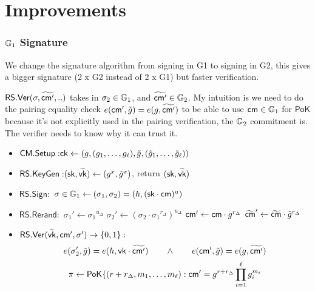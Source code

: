 \newpage
\section{Improvements}


\subsubsection{$\mathbb{G}_1$ Signature}
We change the signature algorithm from signing in G1 to signing in G2, this gives a bigger signature (2 x G2 instead of 2 x G1) but faster verification.    

\noindent $\mathsf{RS.Ver}(\sigma, \widetilde{\mathsf{cm}'}, ..)$ takes in $\sigma_2 \in \mathbb{G}_1$, and $\widetilde{\mathsf{cm}'} \in \mathbb{G}_2$. My intuition is we need to do the pairing equality check $e(\mathsf{cm}', \tilde{g}) = e(g, \widetilde{\mathsf{cm}'}) $ to be able to use $\mathsf{cm} \in \mathbb{G}_1$ for $\mathsf{PoK}$ because it's not explicitly used in the pairing verification, the $\mathbb{G}_2$ commitment is. The verifier needs to know why it can trust it.

\begin{itemize}
   \item $\mathsf{CM.Setup:} \mathsf{ck} \gets (g, (g_1,\ldots,g_\ell), \tilde{g}, (\tilde{g}_1,\ldots,\tilde{g}_\ell))$
   
   \item $\mathsf{RS.KeyGen:} ({\mathsf{sk}}, \widetilde{\mathsf{vk}}) \gets (g^x, \tilde{g}^x)$, return $({\mathsf{sk}}, \widetilde{\mathsf{vk}})$
   
   \item $\mathsf{RS.Sign:}$ ${\sigma} \in \mathbb{G}_1 \gets ({\sigma_1}, {\sigma_2}) = (h, ({\mathsf{sk}} \cdot {\mathsf{cm}})^u)$
   
   \item $\mathsf{RS.Rerand:}$ \qquad ${\sigma_1}' \gets {\sigma_1}^{u_\Delta}$ \qquad ${\sigma_2}' \gets ({\sigma_2} \cdot {\sigma_1}^{r_\Delta})^{u_\Delta}$ \qquad $\mathsf{cm}' \gets \mathsf{cm} \cdot g^{r_\Delta}$ \qquad  $\widetilde{\mathsf{cm}}' \gets \widetilde{\mathsf{cm}} \cdot \tilde{g}^{r_\Delta}$
   
   \item $\mathsf{RS.Ver}(\widetilde{\mathsf{vk}}, \mathsf{cm}', {\sigma}') \to \{0,1\}:$ 
   \[
   e(\sigma_2', \tilde{g}) = e(h, \mathsf{vk} \cdot \widetilde{\mathsf{cm}'}) \qquad \wedge \qquad  e(\mathsf{cm}', \tilde{g}) = e(g, \widetilde{\mathsf{cm}'}) 
   \]
   \[
    \pi \gets \mathsf{PoK}\{(r + r_\Delta, m_1,\ldots,m_\ell): \mathsf{cm}' = g^{r + r_\Delta} \prod_{i=1}^\ell g_i^{m_i}
    \]
\end{itemize}





